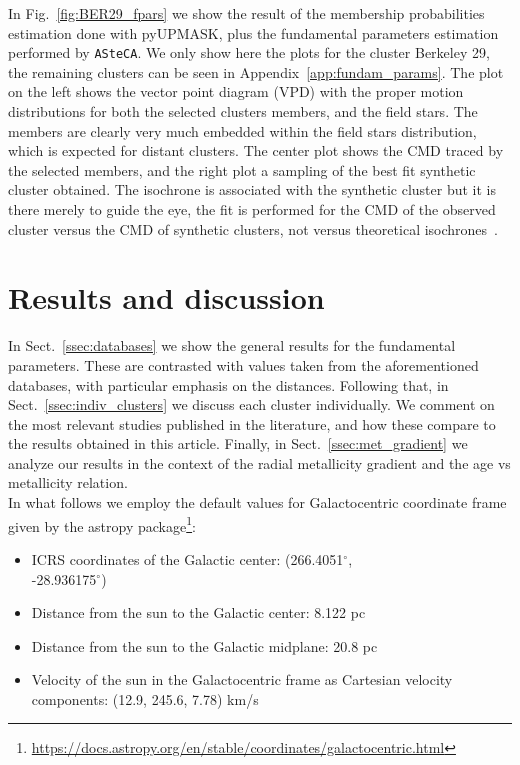 \documentclass[draft]{aa}
\begin{document}
  In Fig.~\ref{fig:BER29_fpars} we show the result of the membership
  probabilities estimation done with pyUPMASK, plus the fundamental parameters
  estimation performed by \texttt{ASteCA}. We only show here the plots for
  the cluster Berkeley 29, the remaining clusters can be seen in
  Appendix~\ref{app:fundam_params}.
  The plot on the left shows the vector point diagram (VPD) with the proper
  motion distributions for both the selected clusters members, and the field
  stars. The members are clearly very much embedded within the field stars
  distribution, which is expected for distant clusters. The center plot shows
  the CMD traced by the selected members, and the right plot a sampling of the
  best fit synthetic cluster obtained. The isochrone is associated with the
  synthetic cluster but it is there merely to guide the eye, the fit is
  performed for the CMD of the observed cluster versus the CMD of synthetic
  clusters, not versus theoretical isochrones~\citep[this is further
  explained in:][]{Perren_2015,Perren_2017,Perren_2020}.\\








\section{Results and discussion}
 \label{sec:results}

 In Sect.~\ref{ssec:databases} we show the general results for the
 fundamental parameters. These are contrasted with values taken from the
 aforementioned databases, with particular emphasis on the distances.
 Following that, in Sect.~\ref{ssec:indiv_clusters} we discuss each cluster
 individually. We comment on the most relevant studies published in the
 literature, and how these compare to the results obtained in this article.
 Finally, in Sect.~\ref{ssec:met_gradient} we analyze our results in the context
 of the radial metallicity gradient and the age vs metallicity relation.\\

 In what follows we employ the default values for Galactocentric coordinate
 frame given by the astropy
 package\footnote{\url{https://docs.astropy.org/en/stable/coordinates/galactocentric.html}}:

 \begin{itemize}
  \item ICRS coordinates of the Galactic center: (266.4051$^{\circ}$,\\
  -28.936175$^{\circ}$)
  \item Distance from the sun to the Galactic center: 8.122 pc
  \item Distance from the sun to the Galactic midplane: 20.8 pc
  \item Velocity of the sun in the Galactocentric frame as Cartesian velocity
  components: (12.9, 245.6, 7.78) km/s
 \end{itemize}
\end{document}
